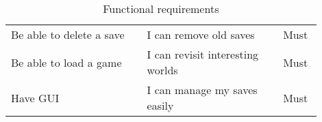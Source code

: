\begin{table}[H]
\begin{tabular}{p{0.4\linewidth}|p{0.4\linewidth}|p{0.1\linewidth}}
        Be able to delete a save                                   & I can remove old saves                                             & Must           \\
        Be able to load a game                                     & I can revisit interesting worlds                                   & Must           \\
        Have GUI                                                   & I can manage my saves easily                                       & Must         \\ \hline
    \end{tabular}
    \caption{Functional requirements}
    \label{tab:functional_requirements}
\end{table}